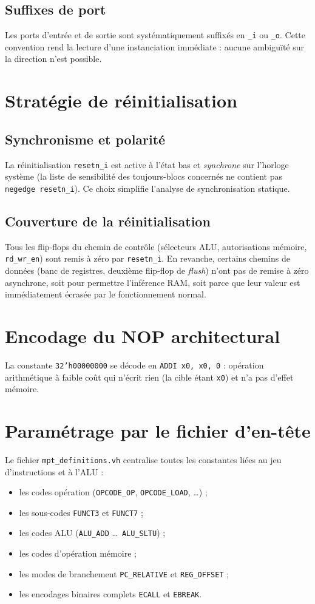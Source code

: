 \documentclass[11pt,a4paper,oneside]{report}
\begin{document}
\subsection{Suffixes de port}
Les ports d'entrée et de sortie sont systématiquement suffixés en
\texttt{\_i} ou \texttt{\_o}. Cette convention rend la lecture
d'une instanciation immédiate : aucune ambiguïté sur la direction
n'est possible.

\section{Stratégie de réinitialisation}
\subsection{Synchronisme et polarité}
La réinitialisation \texttt{resetn\_i} est active à l'état bas et
\emph{synchrone} sur l'horloge système (la liste de sensibilité
des toujours-blocs concernés ne contient pas
\texttt{negedge resetn\_i}). Ce choix simplifie l'analyse de
synchronisation statique.

\subsection{Couverture de la réinitialisation}
Tous les flip-flops du chemin de contrôle (sélecteurs ALU,
autorisations mémoire, \texttt{rd\_wr\_en}) sont remis à zéro par
\texttt{resetn\_i}. En revanche, certains chemins de données
(banc de registres, deuxième flip-flop de \textit{flush}) n'ont
pas de remise à zéro asynchrone, soit pour permettre l'inférence
RAM, soit parce que leur valeur est immédiatement écrasée par le
fonctionnement normal.

\section{Encodage du NOP architectural}
La constante \texttt{32'h00000000} se décode en
\texttt{ADDI x0, x0, 0} : opération arithmétique à faible coût qui
n'écrit rien (la cible étant \texttt{x0}) et n'a pas d'effet
mémoire.

\section{Paramétrage par le fichier d'en-tête}
Le fichier \texttt{mpt\_definitions.vh} centralise toutes les
constantes liées au jeu d'instructions et à l'ALU :
\begin{itemize}
  \item les codes opération (\texttt{OPCODE\_OP},
        \texttt{OPCODE\_LOAD}, \dots) ;
  \item les sous-codes \texttt{FUNCT3} et \texttt{FUNCT7} ;
  \item les codes ALU (\texttt{ALU\_ADD} \dots\ \texttt{ALU\_SLTU}) ;
  \item les codes d'opération mémoire ;
  \item les modes de branchement \texttt{PC\_RELATIVE} et
        \texttt{REG\_OFFSET} ;
  \item les encodages binaires complets \texttt{ECALL} et
        \texttt{EBREAK}.
\end{itemize}
\end{document}
